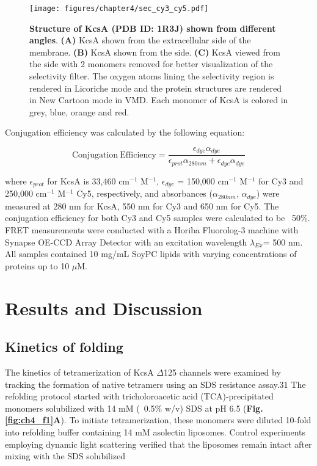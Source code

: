 \begin{figure}[!ht]
\begin{center}
	\texttt{[image: figures/chapter4/sec\_cy3\_cy5.pdf]}
\end{center}
	\caption{\textbf{Structure of KcsA (PDB ID: 1R3J) shown from different angles}. \textbf{(A)} KcsA shown from the extracellular side of the membrane. \textbf{(B)} KcsA shown from the side. \textbf{(C)} KcsA viewed from the side with 2 monomers removed for better visualization of the selectivity filter. The oxygen atoms lining the selectivity region is rendered in Licoriche mode and the protein structures are rendered in New Cartoon mode in VMD. Each monomer of KcsA is colored in grey, blue, orange and red.}
	\label{fig:ch4_f2}
\end{figure}


Conjugation efficiency was calculated by the following equation:



\begin{equation}
	\mathrm{Conjugation\ Efficiency} = \frac{\epsilon_{dye}\alpha_{dye}}{\epsilon_{prot}\alpha_{280nm}+\epsilon_{dye}\alpha_{dye}}
\end{equation}

where $\epsilon_{prot}$ for KcsA is 33,460 cm$^{-1}$ M$^{-1}$, $\epsilon_{dye}$ = 150,000 cm$^{-1}$ M$^{-1}$ for Cy3 and 250,000 cm$^{-1}$ M$^{-1}$ Cy5, respectively, and absorbances ($\alpha_{280nm}$, $\alpha_{dye}$) were measured at 280 nm for KcsA, 550 nm for Cy3 and 650 nm for Cy5. The conjugation efficiency for both Cy3 and Cy5 samples were calculated to be ~50\%. FRET measurements were conducted with a Horiba Fluorolog-3 machine with Synapse OE-CCD Array Detector with an excitation wavelength $\lambda_{Ex}$= 500 nm. All samples contained 10 mg/mL SoyPC lipids with varying concentrations of proteins up to 10 $\mu$M.

\section{Results and Discussion}

\subsection{Kinetics of folding}

The kinetics of tetramerization of KcsA $\Delta$125 channels were examined by tracking the formation of native tetramers using an SDS resistance assay.31 The refolding protocol started with tricholoroacetic acid (TCA)-precipitated monomers solubilized with 14 mM (~0.5\% w/v) SDS at pH 6.5 (\textbf{Fig. \ref{fig:ch4_f1}A}). To initiate tetramerization, these monomers were diluted 10-fold into refolding buffer containing 14 mM asolectin liposomes. Control experiments employing dynamic light scattering verified that the liposomes remain intact after mixing with the SDS solubilized

